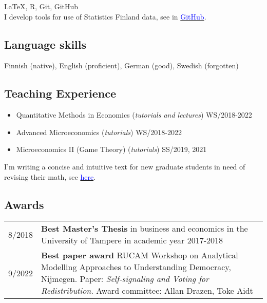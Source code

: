 \documentclass[16pt]{article}
\begin{document}
\LaTeX, R, Git, GitHub \\

\noindent I develop tools for use of Statistics Finland data, see in \href{https://github.com/jalasalmi}{\textcolor{blue}{GitHub}}.

\subsection*{Language skills}
Finnish (native), English (proficient), German (good), Swedish (forgotten)

\subsection*{Teaching Experience}
\begin{itemize} \setlength\itemsep{0.01em}
                          \item Quantitative Methods in Economics (\textit{tutorials and lectures}) WS/2018-2022  
                          \item Advanced Microeconomics (\textit{tutorials}) WS/2018-2022 
                          \item Microeconomics II (Game Theory) (\textit{tutorials}) SS/2019, 2021 
\end{itemize}

\noindent I'm writing a concise and intuitive text for new graduate students in need of revising their math, see \href{https://cloud.uni-konstanz.de/index.php/s/nSm3TmENpPX3q6C}{\textcolor{blue}{here}}.



\subsection*{Awards} 
\begin{tabular}{@{}p{1.5in}p{5in}}
8/2018           & \textbf{Best Master's Thesis} in business and economics in the University of Tampere in academic year 2017-2018 \\
9/2022           & \textbf{Best paper award} RUCAM Workshop on Analytical Modelling Approaches to Understanding Democracy, Nijmegen. Paper: \textit{Self-signaling and Voting for Redistribution}. Award committee: Allan Drazen, Toke Aidt
\end{tabular}
\end{document}
